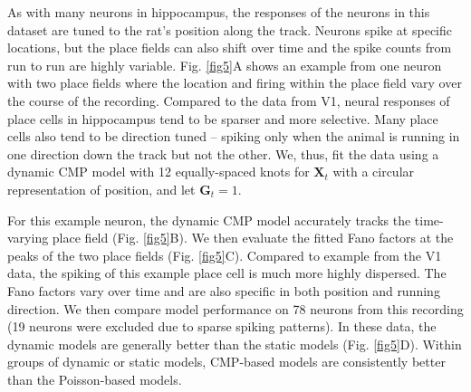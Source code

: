 \documentclass[aoas]{imsart}
\theoremstyle{plain}
\theoremstyle{remark}
\begin{document}
As with many neurons in hippocampus, the responses of the neurons in this dataset are tuned to the rat’s position along the track. Neurons spike at specific locations, but the place fields can also shift over time and the spike counts from run to run are highly variable. Fig. \ref{fig5}A shows an example from one neuron with two place fields where the location and firing within the place field vary over the course of the recording. Compared to the data from V1, neural responses of place cells in hippocampus tend to be sparser and more selective. Many place cells also tend to be direction tuned – spiking only when the animal is running in one direction down the track but not the other. We, thus, fit the data using a dynamic CMP model with 12 equally-spaced knots for $\bm{X}_t$ with a circular representation of position, and let $\bm{G}_t=1$.

For this example neuron, the dynamic CMP model accurately tracks the time-varying place field (Fig. \ref{fig5}B). We then evaluate the fitted Fano factors at the peaks of the two place fields (Fig. \ref{fig5}C). Compared to example from the V1 data, the spiking of this example place cell is much more highly dispersed. The Fano factors vary over time and are also specific in both position and running direction. We then compare model performance on 78 neurons from this recording (19 neurons were excluded due to sparse spiking patterns). In these data, the dynamic models are generally better than the static models (Fig. \ref{fig5}D). Within groups of dynamic or static models, CMP-based models are consistently better than the Poisson-based models.
\end{document}
